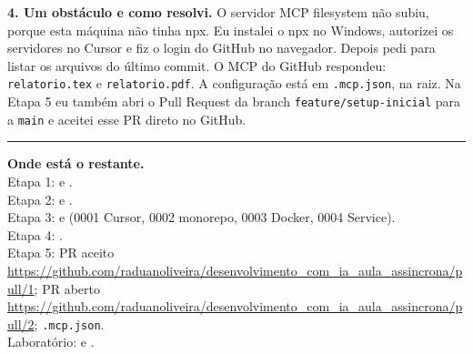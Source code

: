 \documentclass[12pt,a4paper]{article}
\begin{document}
\textbf{4. Um obstáculo e como resolvi.} O servidor MCP filesystem não subiu, porque esta máquina não tinha npx. Eu instalei o npx no Windows, autorizei os servidores no Cursor e fiz o login do GitHub no navegador. Depois pedi para listar os arquivos do último commit. O MCP do GitHub respondeu: \texttt{relatorio.tex} e \texttt{relatorio.pdf}. A configuração está em \texttt{.mcp.json}, na raiz. Na Etapa 5 eu também abri o Pull Request da branch \texttt{feature/setup-inicial} para a \texttt{main} e aceitei esse PR direto no GitHub.

\vspace{0.1em}
\hrule
\vspace{0.3em}

\textbf{Onde está o restante.}\\
Etapa 1:  e .\\
Etapa 2:  e .\\
Etapa 3:  e  (0001 Cursor, 0002 monorepo, 0003 Docker, 0004 Service).\\
Etapa 4: .\\
Etapa 5: PR aceito \url{https://github.com/raduanoliveira/desenvolvimento_com_ia_aula_assincrona/pull/1}; PR aberto \url{https://github.com/raduanoliveira/desenvolvimento_com_ia_aula_assincrona/pull/2}; \texttt{.mcp.json}.\\
Laboratório:  e .
\end{document}
